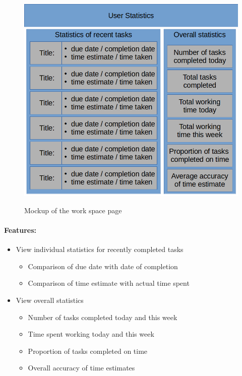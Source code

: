 \documentclass{article}
\begin{document}
\begin{minipage}{0.5\textwidth}
	\begin{figure}[H]
		\includegraphics[width=\linewidth]{Mockups/statistics.png}
		\label{fig:statistics_mockup}
		\caption{Mockup of the work space page}
	\end{figure}
\end{minipage} \hfill
\begin{minipage}{0.45\textwidth}
	\paragraph{Features:}
	\begin{itemize}
		\item View individual statistics for recently completed tasks
		      \begin{itemize}
			      \item Comparison of due date with date of completion
			      \item Comparison of time estimate with actual time spent
		      \end{itemize}
		\item View overall statistics
		      \begin{itemize}
			      \item Number of tasks completed today and this week
			      \item Time spent working today and this week
			      \item Proportion of tasks completed on time
			      \item Overall accuracy of time estimates
		      \end{itemize}
	\end{itemize}
\end{minipage}
\end{document}

